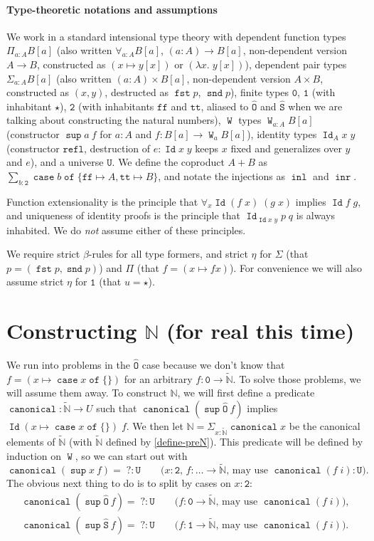 \documentclass[a4paper,UKenglish,cleveref,nameinlink,autoref,thm-restate]{lipics-v2019}
\newcommand{\zero}{\mathtt{0}}
\newcommand{\one}{\mathtt{1}}
\newcommand{\bool}{\mathtt{2}}
\newcommand{\true}{\mathtt{tt}}
\newcommand{\false}{\mathtt{ff}}
\newcommand{\codeO}{\mathtt{\hat{O}}}
\newcommand{\codeS}{\mathtt{\hat{S}}}
\newcommand{\U}{\mathtt{U}}
\DeclareMathOperator{\supop}{\mathtt{sup}}
\renewcommand{\sup}[2]{\supop {#1}\:\!{#2}}
\newcommand{\N}{\hyperref[define-N]{\mathbb{N}}}
\newcommand{\preN}{\hyperref[define-preN]{\tilde{\mathbb{N}}}}
\DeclareMathOperator{\case}{\mathtt{case}}
\newcommand{\caset}[2]{\case {#1}\;\mathtt{of}\;\{{#2}\}}
\DeclareMathOperator{\W}{\mathtt{W}}
\DeclareMathOperator{\Idop}{\mathtt{Id}}
\newcommand{\Id}[2]{\Idop {#1}\;{#2}}
\newcommand{\IdA}[3]{\Idop_{#1}{#2}\;{#3}}
\newcommand{\refl}{\mathtt{refl}}
\DeclareMathOperator{\inl}{\mathtt{inl}}
\DeclareMathOperator{\inr}{\mathtt{inr}}
\DeclareMathOperator{\fst}{\mathtt{fst}}
\DeclareMathOperator{\snd}{\mathtt{snd}}
\DeclareMathOperator{\canonical}{\hyperref[define-canonical]{\mathtt{canonical}}}
\begin{document}
\paragraph*{Type-theoretic notations and assumptions}

We work in a standard intensional type theory with
dependent function types $\Pi_{a : A}B[a]$ (also written $\forall_{a : A}B[a]$, $(a : A) \to B[a]$, non-dependent version $A \to B$, constructed as $(x \mapsto y[x])$ or $(\lambda x.\;y[x])$),
dependent pair types $\Sigma_{a : A}B[a]$ (also written $(a : A) \times B[a]$, non-dependent version $A \times B$, constructed as $(x, y)$, destructed as $\fst p$, $\snd p$),
finite types $\zero$, $\one$ (with inhabitant $\star$), $\bool$ (with inhabitants $\false$ and $\true$, aliased to $\codeO$ and $\codeS$ when we are talking about constructing the natural numbers),
$\W$ types $\W_{a : A}B[a]$ (constructor $\sup{a}{f}$ for $a : A$ and $f : B[a] \to \W_{a}B[a]$),
identity types $\IdA{A}{x}{y}$ (constructor $\refl$, destruction of $e : \Id{x}{y}$ keeps $x$ fixed and generalizes over $y$ and $e$),
and a universe $\U$.
We define the coproduct $A + B$ as $\sum_{b : \bool}\caset{b}{\false\mapsto A, \true\mapsto B}$, and notate the injections as $\inl$ and $\inr$.

Function extensionality is the principle that $\forall_x\Id{(f\;x)}{(g\;x)}$ implies $\Id{f}{g}$, and uniqueness of identity proofs is the principle that $\IdA{\Id{x}{y}}{p}{q}$ is always inhabited. We do \emph{not} assume either of these principles.

We require strict $\beta$-rules for all type formers, and strict $\eta$ for $\Sigma$ (that $p = (\fst p, \snd p)$) and $\Pi$ (that $f = (x \mapsto f x)$). For convenience we will also assume strict $\eta$ for $\one$ (that $u = \star$).

\section{Constructing \texorpdfstring{$\N$}{ℕ} (for real this time)}\label{construct-N}

We run into problems in the $\codeO$ case because we don't know that $f = (x\mapsto\caset{x}{})$ for an arbitrary $f : \zero \to \preN$.
To solve those problems, we will assume them away.
To construct $\N$, we will first define a predicate $\canonical : \preN \to U$ such that $\canonical(\sup{\codeO}{f})$ implies $\Id{(x\mapsto\caset{x}{})}{f}$.
We then let $\N = \Sigma_{x : \preN}\canonical x$ be the canonical elements of $\preN$ (with $\preN$ defined by \cref{define-preN}).
This predicate will be defined by induction on $\W$, so we can start out with \[\canonical (\sup{x}{f}) =\; ? : \U\qquad\text{($x : \bool$, $f : \dots \to \preN$, may use $\canonical (f\; i) : \U$)}.\]
The obvious next thing to do is to split by cases on $x : \bool$:
\begin{gather*}
\canonical (\sup{\codeO}{f}) =\; ? : \U\qquad\text{($f : \zero \to \preN$, may use $\canonical(f\;i)$)},\\
\canonical (\sup{\codeS}{f}) =\; ? : \U\qquad\text{($f : \one \to \preN$, may use $\canonical(f\;i)$)}.
\end{gather*}
\end{document}
